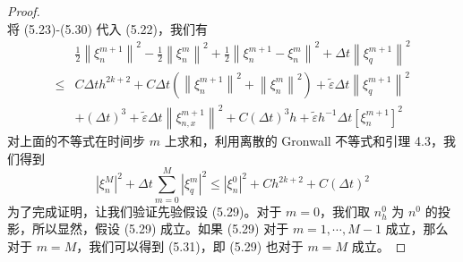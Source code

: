 \begin{proof}
$$    $$
    将 (5.23)-(5.30) 代入 (5.22)，我们有
    $$
        \begin{aligned}
                 & \frac{1}{2}\left\|\xi_{n}^{m+1}\right\|^{2}-\frac{1}{2}\left\|\xi_{n}^{m}\right\|^{2}+\frac{1}{2}\left\|\xi_{n}^{m+1}-\xi_{n}^{m}\right\|^{2}+\Delta t\left\|\xi_{q}^{m+1}\right\|^{2} \\
            \leq & C \Delta t h^{2 k+2}+C \Delta t\left(\left\|\xi_{n}^{m+1}\right\|^{2}+\left\|\xi_{n}^{m}\right\|^{2}\right)+\tilde{\varepsilon} \Delta t\left\|\xi_{q}^{m+1}\right\|^{2}               \\
                 & +(\Delta t)^{3}+\tilde{\varepsilon} \Delta t\left\|\xi_{n, x}^{m+1}\right\|^{2}+C(\Delta t)^{3} h+\tilde{\varepsilon} h^{-1} \Delta t\left[\xi_{n}^{m+1}\right]^{2}
        \end{aligned}
    $$
    对上面的不等式在时间步 $m$ 上求和，利用离散的 Gronwall 不等式和引理 4.3，我们得到
    $$ \left|\xi_{n}^{M}\right|^{2}+\Delta t \sum_{m=0}^{M}\left|\xi_{q}^{m}\right|^{2} \leq\left|\xi_{n}^{0}\right|^{2}+C h^{2 k+2}+C(\Delta t)^{2} $$
    为了完成证明，让我们验证先验假设 (5.29)。对于 $m=0$，我们取 $n_{h}^{0}$ 为 $n^{0}$ 的投影，所以显然，假设 (5.29) 成立。如果 (5.29) 对于 $m=1, \cdots, M-1$ 成立，那么对于 $m=M$，我们可以得到 (5.31)，即 (5.29) 也对于 $m=M$ 成立。
\end{proof}
